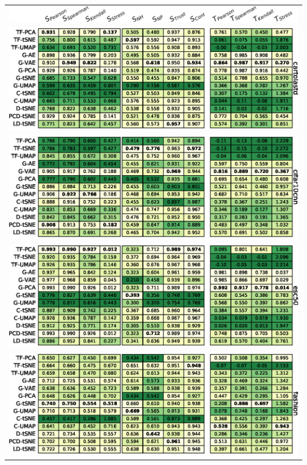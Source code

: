 \begin{table}[h]
\begin{tabular}{c}
  \vspace{-.1cm}
  \includegraphics[width=\linewidth]{figures/projection-algorithm/table_header.png} \\
  \includegraphics[width=\linewidth]{figures/projection-algorithm/table_cartolastd.eps} \\
  \includegraphics[width=\linewidth]{figures/projection-algorithm/table_cifar10cnn.eps} \\ 
  \includegraphics[width=\linewidth]{figures/projection-algorithm/table_esc50.eps} \\
  \includegraphics[width=\linewidth]{figures/projection-algorithm/table_fashion.eps} \\
\end{tabular}
\end{table}


